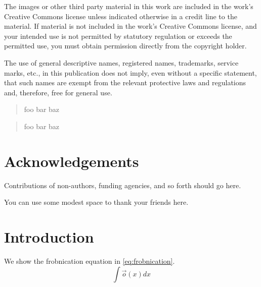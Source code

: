 \documentclass[b5paper,10pt]{ruthesis2}
\begin{document}
The images or other third party material in this work are included in the work's Creative Commons license unless indicated otherwise in a credit line to the material.
If material is not included in the work's Creative Commons license, and your intended use is not permitted by statutory regulation or exceeds the permitted use, you must obtain permission directly from the copyright holder.

The use of general descriptive names, registered names, trademarks, service marks, etc., in this publication does not imply, even without a specific statement, that such names are exempt from the relevant protective laws and regulations and, therefore, free for general use.
\endgroup

\frontmatter

\clearpage{}
\begin{abstract}
    foo bar baz
\end{abstract}

\clearpage{}
\begin{abstract}
    foo bar baz
\end{abstract}

\clearpage{}

\tableofcontents

\chapter*{Acknowledgements}

Contributions of non-authors, funding agencies, and so forth should go here.

You can use some modest space to thank your friends here.


\chapter{Introduction}

We show the frobnication equation in \eqref{eq:frobnication}.
\begin{equation}
    \label{eq:frobnication}
    \int\vec{o}(x)dx
\end{equation}
\end{document}
